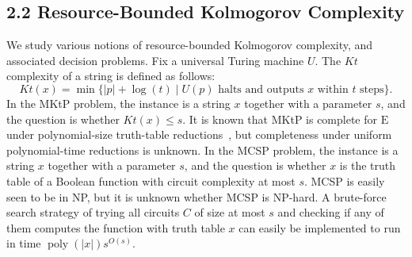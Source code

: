 \documentclass[10pt,a4paper]{article}
\newcommand{\poly}{\operatorname{poly}}
\begin{document}
\subsection*{2.2 Resource-Bounded Kolmogorov Complexity}
We study various notions of resource-bounded Kolmogorov complexity, and associated decision problems.
Fix a universal Turing machine $U$. The $Kt$ complexity of a string is defined as follows:
\[Kt(x)=\min\{|p|+\log(t)\mid U(p)\text{ halts and outputs }x\text{ within }t\text{ steps}\}.\]
In the MKtP problem, the instance is a string $x$ together with a parameter $s$, and the question is whether $Kt(x)\leq s$.
It is known that MKtP is complete for $\mathrm E$ under polynomial-size truth-table reductions~\cite{ref2}, but completeness under uniform polynomial-time reductions is unknown.
In the MCSP problem, the instance is a string $x$ together with a parameter $s$, and the question is whether $x$ is the truth table of a Boolean function with circuit complexity at most $s$.
MCSP is easily seen to be in NP, but it is unknown whether MCSP is NP-hard. A brute-force search strategy of trying all circuits $C$ of size at most $s$ and checking if any of them computes the function with truth table $x$ can easily be implemented to run in time $\poly(|x|)s^{O(s)}$.
\end{document}
